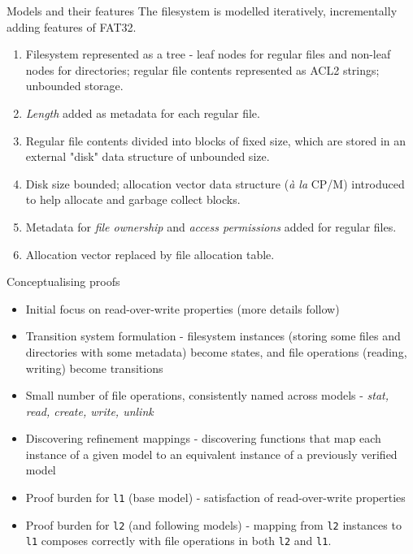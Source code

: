 \documentclass{beamer}
\begin{document}
\begin{frame}{Models and their features}
  The filesystem is modelled iteratively, incrementally
    adding features of FAT32.
  \begin{enumerate}
  \item Filesystem represented as a tree - leaf
    nodes for regular files and non-leaf nodes for
    directories; regular file contents represented as ACL2
    strings; unbounded storage.
  \item \textit{Length} added as metadata for each regular file.
  \item Regular file contents divided into
    blocks of fixed size, which are stored in an external
    "disk" data structure of unbounded size.
  \item Disk size bounded; allocation vector data structure
    (\textit{\`{a} la} CP/M) introduced to help allocate and garbage
    collect blocks.
  \item Metadata for \textit{file ownership} and \textit{access
    permissions} added for regular files.
  \item Allocation vector replaced by file allocation table.
  \end{enumerate}
\end{frame}

\begin{frame}{Conceptualising proofs}
  \begin{itemize}
  \item Initial focus on read-over-write properties (more details follow)
  \item Transition system formulation - filesystem instances
    (storing some files and directories with some metadata) become
    states, and file operations (reading, writing) become transitions
  \item Small number of file operations, consistently named across
    models - \textit{stat, read, create, write, unlink}
  \item Discovering refinement mappings - discovering functions that
    map each instance of a given model to an equivalent instance of a
    previously verified model
  \item Proof burden for \texttt{l1} (base model) - satisfaction of
    read-over-write properties
  \item Proof burden for \texttt{l2} (and following models) - mapping
    from \texttt{l2} instances to \texttt{l1} composes correctly with
    file operations in both \texttt{l2} and \texttt{l1}.
  \end{itemize}
\end{frame}
\end{document}
